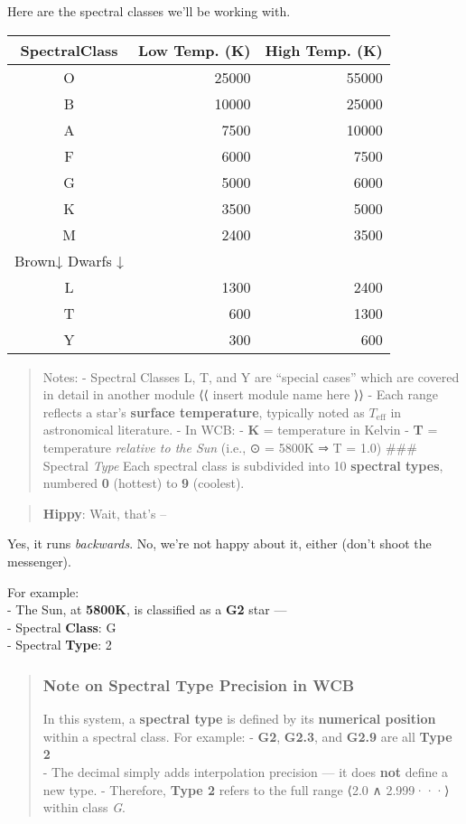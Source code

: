 \documentclass[
  letterpaper,
]{book}
\begin{document}
Here are the spectral classes we'll be working with.

\begin{longtable}[]{@{}crr@{}}
\toprule\noalign{}
SpectralClass & Low Temp. (K) & High Temp. (K) \\
\midrule\noalign{}
\endhead
\bottomrule\noalign{}
\endlastfoot
O & 25000 & 55000 \\
B & 10000 & 25000 \\
A & 7500 & 10000 \\
F & 6000 & 7500 \\
G & 5000 & 6000 \\
K & 3500 & 5000 \\
M & 2400 & 3500 \\
Brown↓ Dwarfs ↓ & & \\
L & 1300 & 2400 \\
T & 600 & 1300 \\
Y & 300 & 600 \\
\end{longtable}

\begin{quote}
Notes: - Spectral Classes L, T, and Y are ``special cases'' which are
covered in detail in another module ⟨⟨ insert module name here ⟩⟩ - Each
range reflects a star's \textbf{surface temperature}, typically noted as
\(T_{\text{eff}}\) in astronomical literature. - In WCB: - \textbf{K} =
temperature in Kelvin - \textbf{T} = temperature \emph{relative to the
Sun} (i.e., ⊙ = 5800K ⇒ T = 1.0) \#\#\# Spectral \emph{Type} Each
spectral class is subdivided into 10 \textbf{spectral types}, numbered
\textbf{0} (hottest) to \textbf{9} (coolest).
\end{quote}

\begin{quote}
\textbf{Hippy}: Wait, that's --
\end{quote}

Yes, it runs \emph{backwards}. No, we're not happy about it, either
(don't shoot the messenger).

For example:\\
- The Sun, at \textbf{5800K}, is classified as a \textbf{G2} star ---\\
- Spectral \textbf{Class}: G\\
- Spectral \textbf{Type}: 2

\begin{quote}
\subsubsection{Note on Spectral Type Precision in
WCB}\label{note-on-spectral-type-precision-in-wcb}

In this system, a \textbf{spectral type} is defined by its
\textbf{numerical position} within a spectral class. For example: -
\textbf{G2}, \textbf{G2.3}, and \textbf{G2.9} are all \textbf{Type 2}\\
- The decimal simply adds interpolation precision --- it does
\textbf{not} define a new type. - Therefore, \textbf{Type 2} refers to
the full range ⟨2.0 ∧ 2.999···⟩ within class \emph{G}.
\end{quote}
\end{document}
